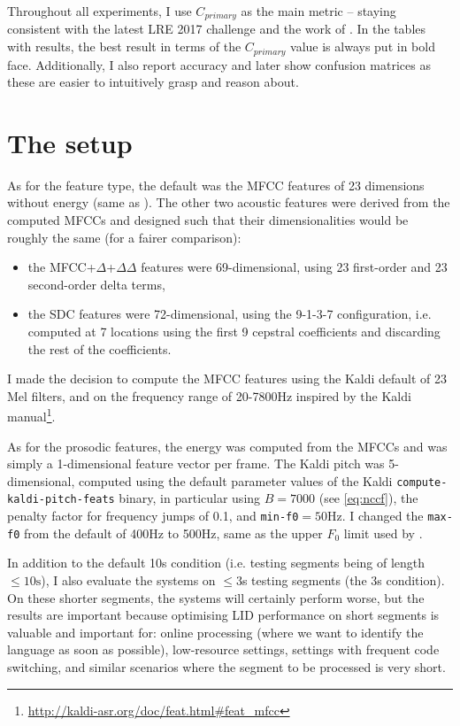 \documentclass[bsc,frontabs,twoside,singlespacing,parskip,deptreport]{infthesis}
\begin{document}
{  %
  Throughout all experiments, I use $C_{primary}$ as the main metric -- staying consistent with the latest LRE 2017 challenge and the work of \citet{Snyder_et_al_2018}. In the tables with results, the best result in terms of the $C_{primary}$ value is always put in bold face. Additionally, I also report accuracy and later show confusion matrices as these are easier to intuitively grasp and reason about.

  \section{The setup}{
    \label{sec:exp-setup}
    As for the feature type, the default was the MFCC features of 23 dimensions without energy (same as \citet{Snyder_et_al_2018}). The other two acoustic features were derived from the computed MFCCs and designed such that their dimensionalities would be roughly the same (for a fairer comparison):
    \begin{itemize}
      \item {the MFCC+$\Delta$+$\Delta\Delta$ features were 69-dimensional, using 23 first-order and 23 second-order delta terms,}
      \item {the SDC features were 72-dimensional, using the 9-1-3-7 configuration, i.e. computed at 7 locations using the first 9 cepstral coefficients and discarding the rest of the coefficients.}
    \end{itemize}
    I made the decision to compute the MFCC features using the Kaldi default of 23 Mel filters, and on the frequency range of 20-7800Hz inspired by the Kaldi manual\footnote{\url{http://kaldi-asr.org/doc/feat.html\#feat_mfcc}}.

    As for the prosodic features, the energy was computed from the MFCCs and was simply a 1-dimensional feature vector per frame. The Kaldi pitch was 5-dimensional, computed using the default parameter values of the Kaldi \verb|compute-kaldi-pitch-feats| binary, in particular using $B=7000$ (see \autoref{eq:nccf}), the penalty factor for frequency jumps of 0.1, and \verb|min-f0|$=50$Hz. I changed the \verb|max-f0| from the default of 400Hz to 500Hz, same as the upper $F_0$ limit used by \citet{Lin_et_al_2005}.

    In addition to the default 10s condition (i.e. testing segments being of length $\leq10\textrm{s}$), I also evaluate the systems on $\leq3$s testing segments (the 3s condition). On these shorter segments, the systems will certainly perform worse, but the results are important because optimising LID performance on short segments is valuable and important for: online processing (where we want to identify the language as soon as possible), low-resource settings, settings with frequent code switching, and similar scenarios where the segment to be processed is very short.
  }

}
\end{document}
